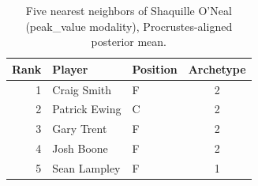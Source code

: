 \begin{table}[htbp]
  \centering\small
  \begin{tabular}{rllc}
    \toprule
    Rank & Player & Position & Archetype \\
    \midrule
    1 & Craig Smith & F & 2 \\
    2 & Patrick Ewing & C & 2 \\
    3 & Gary Trent & F & 2 \\
    4 & Josh Boone & F & 2 \\
    5 & Sean Lampley & F & 1 \\
    \bottomrule
  \end{tabular}
  \caption{Five nearest neighbors of Shaquille O'Neal (peak_value modality), Procrustes-aligned posterior mean.}
  \label{tab:Shaquille_O_Neal_neighbors_peak_value}
\end{table}

